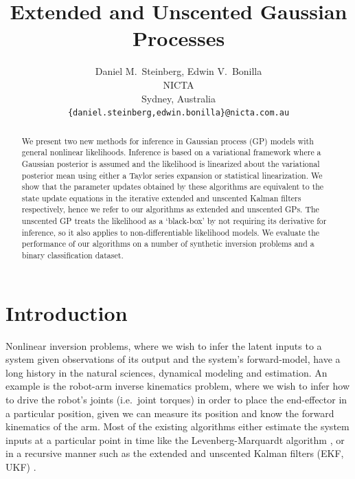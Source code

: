 \documentclass{article} %
\title{Extended and Unscented Gaussian Processes}
\author{
    Daniel M.~Steinberg, Edwin V.~Bonilla \\
    NICTA \\
    Sydney, Australia\\
    \texttt{\{daniel.steinberg,edwin.bonilla\}@nicta.com.au}
}
\begin{document}
\maketitle

\begin{abstract}

    We present two new methods for inference in Gaussian process (GP) models
    with general nonlinear likelihoods. Inference is based on a variational
    framework where a Gaussian posterior is assumed and the likelihood is
    linearized about the variational posterior mean using either a %
    Taylor series expansion or statistical linearization. We show that the
    parameter updates obtained by these algorithms are equivalent to the state
    update equations in the iterative extended and unscented Kalman filters
    respectively, hence we refer to our algorithms as extended and unscented
    GPs. The unscented GP treats the likelihood as a `black-box' by not
    requiring its derivative for inference, so it also applies to
    non-differentiable likelihood models. We evaluate the performance of our
    algorithms on a  number of synthetic inversion problems and a binary
    classification dataset.
    
\end{abstract}


\section{Introduction}

Nonlinear inversion problems, where we wish to infer the latent inputs to a
system given observations of its output and the system's forward-model, have a
long history in the natural sciences, dynamical modeling and estimation. An
example is the robot-arm inverse kinematics problem, where we wish to infer how
to drive the robot's joints (i.e.~joint torques) in order to place the
end-effector in a particular position, given we can measure its position and
know the forward kinematics of the arm. Most of the existing algorithms either
estimate the system inputs at a particular point in time like the
Levenberg-Marquardt algorithm \cite{Marquardt1963}, or in a recursive manner
such as the extended and unscented Kalman filters (EKF, UKF) \cite{Julier2004}. 
\end{document}
